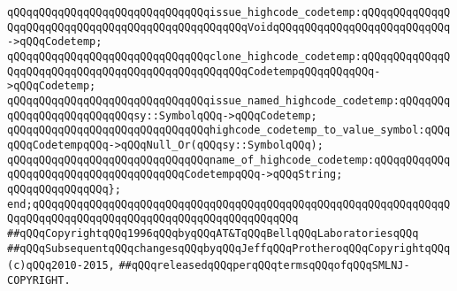 \newline
\verb|qQQqqQQqqQQqqQQqqQQqqQQqqQQqqQQqissue_highcode_codetemp:qQQqqQQqqQQqqQQqqQQqqQQqqQQqqQQqqQQqqQQqqQQqqQQqqQQqVoidqQQqqQQqqQQqqQQqqQQqqQQqqQQq->qQQqCodetemp;|\newline
\verb|qQQqqQQqqQQqqQQqqQQqqQQqqQQqqQQqclone_highcode_codetemp:qQQqqQQqqQQqqQQqqQQqqQQqqQQqqQQqqQQqqQQqqQQqqQQqqQQqCodetempqQQqqQQqqQQq->qQQqCodetemp;|\newline
\verb|qQQqqQQqqQQqqQQqqQQqqQQqqQQqqQQqissue_named_highcode_codetemp:qQQqqQQqqQQqqQQqqQQqqQQqqQQqsy::SymbolqQQq->qQQqCodetemp;|\newline
\newline
\verb|qQQqqQQqqQQqqQQqqQQqqQQqqQQqqQQqhighcode_codetemp_to_value_symbol:qQQqqQQqCodetempqQQq->qQQqNull_Or(qQQqsy::SymbolqQQq);|\newline
\verb|qQQqqQQqqQQqqQQqqQQqqQQqqQQqqQQqname_of_highcode_codetemp:qQQqqQQqqQQqqQQqqQQqqQQqqQQqqQQqqQQqqQQqCodetempqQQq->qQQqString;|\newline
\newline
\verb|qQQqqQQqqQQqqQQq};|\newline
\verb|end;qQQqqQQqqQQqqQQqqQQqqQQqqQQqqQQqqQQqqQQqqQQqqQQqqQQqqQQqqQQqqQQqqQQqqQQqqQQqqQQqqQQqqQQqqQQqqQQqqQQqqQQqqQQqqQQq|\newline
\newline
\verb|##qQQqCopyrightqQQq1996qQQqbyqQQqAT&TqQQqBellqQQqLaboratoriesqQQq|\newline
\verb|##qQQqSubsequentqQQqchangesqQQqbyqQQqJeffqQQqProtheroqQQqCopyrightqQQq(c)qQQq2010-2015,|\newline
\verb|##qQQqreleasedqQQqperqQQqtermsqQQqofqQQqSMLNJ-COPYRIGHT.|\newline

